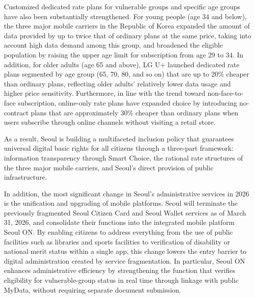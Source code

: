 Customized dedicated rate plans for vulnerable groups and specific age groups have also been substantially strengthened. For young people (age 34 and below), the three major mobile carriers in the Republic of Korea expanded the amount of data provided by up to twice that of ordinary plans at the same price, taking into account high data demand among this group, and broadened the eligible population by raising the upper age limit for subscription from age 29 to 34. In addition, for older adults (age 65 and above), LG U+ launched dedicated rate plans segmented by age group (65, 70, 80, and so on) that are up to 20\% cheaper than ordinary plans, reflecting older adults' relatively lower data usage and higher price sensitivity. Furthermore, in line with the trend toward non-face-to-face subscription, online-only rate plans have expanded choice by introducing no-contract plans that are approximately 30\% cheaper than ordinary plans when users subscribe through online channels without visiting a retail store.

As a result, Seoul is building a multifaceted inclusion policy that guarantees universal digital basic rights for all citizens through a three-part framework: information transparency through Smart Choice, the rational rate structures of the three major mobile carriers, and Seoul's direct provision of public infrastructure.

In addition, the most significant change in Seoul's administrative services in 2026 is the unification and upgrading of mobile platforms. Seoul will terminate the previously fragmented Seoul Citizen Card and Seoul Wallet services as of March 31, 2026, and consolidate their functions into the integrated mobile platform Seoul ON. By enabling citizens to address everything from the use of public facilities such as libraries and sports facilities to verification of disability or national merit status within a single app, this change lowers the entry barrier to digital administration created by service fragmentation. In particular, Seoul ON enhances administrative efficiency by strengthening the function that verifies eligibility for vulnerable-group status in real time through linkage with public MyData, without requiring separate document submission.

